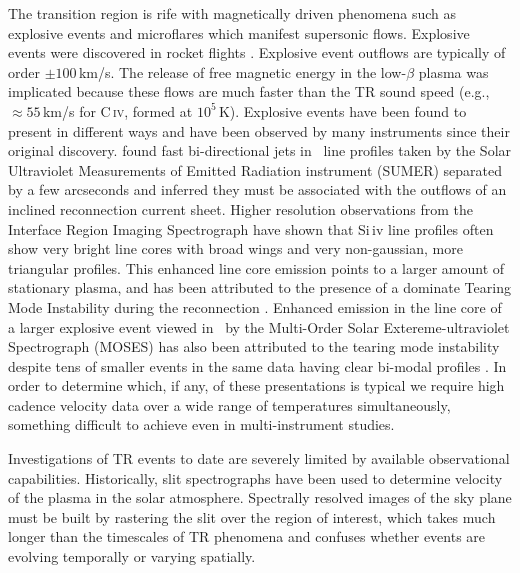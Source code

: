     The transition region is rife with magnetically driven phenomena such as explosive events \cite[e.g.,][]{dere1991} and microflares \citep{gontikakis2012} which manifest supersonic flows.
    Explosive events were discovered in rocket flights \citep{Dere1989}. 
    Explosive event outflows are typically of order $\pm 100$\,km/s. 
    The release of free magnetic energy in the low-$\beta$ plasma was implicated because these flows are much faster than the TR sound speed (e.g., $\approx55$\,km/s  for C\,\textsc{iv}, formed at $10^5$\,K).
    Explosive events have been found to present in different ways and have been observed by many instruments since their original discovery.
    \citet{innes1997} found fast bi-directional jets in \siiv \ line profiles taken by the Solar Ultraviolet Measurements of Emitted Radiation instrument (SUMER)  \citep{SUMER} separated by a few arcseconds and inferred they must be associated with the outflows of an inclined reconnection current sheet.
    Higher resolution observations from the Interface Region Imaging Spectrograph \citep[IRIS]{depontieu2014} have shown that Si\,{\sc iv} line profiles often show very bright line cores with broad wings and very non-gaussian, more triangular profiles.%
    This enhanced line core emission points to a larger amount of stationary plasma, and has been attributed to the presence of a dominate Tearing Mode Instability during the reconnection \citep{Innes2015}.
    Enhanced emission in the line core of a larger explosive event viewed in \heii \ by the Multi-Order Solar Extereme-ultraviolet Spectrograph (MOSES)  has also been attributed to the tearing mode instability \citep{Fox10} despite tens of smaller events in the same data having clear bi-modal profiles \citep{Rust2019}.
    In order to determine which, if any, of these presentations is typical we require high cadence velocity data over a wide range of temperatures simultaneously, something difficult to achieve even in multi-instrument studies.
    
    
    Investigations of TR events to date are severely limited by available observational capabilities. 
    Historically, slit spectrographs have been used to determine velocity of the plasma in the solar atmosphere.   
    Spectrally resolved images of the sky plane must be built by rastering the slit over the region of interest, which takes much longer than the timescales of TR phenomena and confuses whether events are evolving temporally or varying spatially.  
    

